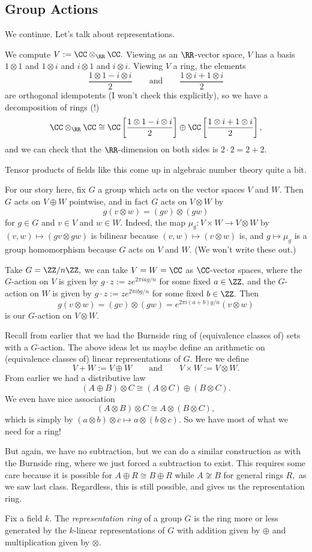 \subsection{Group Actions}
We continue. Let's talk about representations.
\begin{ex}
	We compute $V:=\CC\otimes_\RR\CC.$ Viewing as an $\RR$-vector space, $V$ has a basis $1\otimes 1$ and $1\otimes i$ and $i\otimes1$ and $i\otimes i.$ Viewing $V$ a ring, the elements
	\[\frac{1\otimes1-i\otimes i}2\qquad\text{and}\qquad\frac{1\otimes i+1\otimes i}2\]
	are orthogonal idempotents (I won't check this explicitly), so we have a decomposition of rings (!)
	\[\CC\otimes_\RR\CC\cong\CC\left[\frac{1\otimes1-i\otimes i}2\right]\oplus\CC\left[\frac{1\otimes i+1\otimes i}2\right],\]
	and we can check that the $\RR$-dimension on both sides is $2\cdot2=2+2.$
\end{ex}
\begin{remark}
	Tensor products of fields like this come up in algebraic number theory quite a bit.
\end{remark}
For our story here, fix $G$ a group which acts on the vector spaces $V$ and $W.$ Then $G$ acts on $V\oplus W$ pointwise, and in fact $G$ acts on $V\otimes W$ by
\[g(v\otimes w)=(gv)\otimes(gw)\]
for $g\in G$ and $v\in V$ and $w\in W.$ Indeed, the map $\mu_g:V\times W\to V\otimes W$ by $(v,w)\mapsto(gv\otimes gw)$ is bilinear because $(v,w)\mapsto(v\otimes w)$ is, and $g\mapsto\mu_g$ is a group homomorphism because $G$ acts on $V$ and $W.$ (We won't write these out.)
\begin{example}
	Take $G=\ZZ/n\ZZ,$ we can take $V=W=\CC$ as $\CC$-vector spaces, where the $G$-action on $V$ is given by $g\cdot z:=ze^{2\pi iag/n}$ for some fixed $a\in\ZZ,$ and the $G$-action on $W$ is given by $g\cdot z:=ze^{2\pi ibg/n}$ for some fixed $b\in\ZZ.$ Then
	\[g(v\otimes w)=(gv)\otimes(gw)=e^{2\pi i(a+b)g/n}(v\otimes w)\]
	is our $G$-action on $V\otimes W.$
\end{example}
Recall from earlier that we had the Burnside ring of (equivalence classes of) sets with a $G$-action. The above ideas let us maybe define an arithmetic on (equivalence classes of) linear representations of $G.$ Here we define
\[V+W:=V\oplus W\qquad\text{and}\qquad V\times W:=V\otimes W.\]
From earlier we had a distributive law
\[(A\oplus B)\otimes C\cong(A\otimes C)\oplus(B\otimes C).\]
We even have nice association
\[(A\otimes B)\otimes C\cong A\otimes(B\otimes C),\]
which is simply by $(a\otimes b)\otimes c\mapsto a\otimes (b\otimes c).$ So we have most of what we need for a ring!

But again, we have no subtraction, but we can do a similar construction as with the Burnside ring, where we just forced a subtraction to exist. This requires some care because it is possible for $A\oplus R\cong B\oplus R$ while $A\not\cong B$ for general rings $R,$ as we saw last class. Regardless, this is still possible, and gives us the representation ring.
\begin{definition}
	Fix a field $k.$ The \textit{representation ring} of a group $G$ is the ring more or less generated by the $k$-linear representations of $G$ with addition given by $\oplus$ and multiplication given by $\otimes.$
\end{definition}